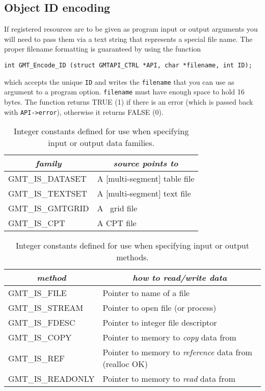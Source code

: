 \documentclass[11pt]{report}
\begin{document}
\subsection{Object ID encoding}
If registered resources are to be given as program input or output arguments you will need to pass them via
a text string that represents a special file name.  The proper filename formatting is guaranteed by using the
function

\begin{verbatim}
int GMT_Encode_ID (struct GMTAPI_CTRL *API, char *filename, int ID);
\end{verbatim}
which accepts the unique \texttt{ID} and writes the \texttt{filename} that
you can use as argument to a program option.  \texttt{filename} must have enough space to hold 16 bytes.
The function returns TRUE (1) if there is an error (which is passed back with \texttt{API->error}),
otherwise it returns FALSE (0).


\begin{table}[h]
\small
\centering
\begin{tabular}{|l|l|} \hline
\multicolumn{1}{|c|}{\emph{family}} & \multicolumn{1}{c|}{\emph{source points to}} \\ \hline
GMT\_IS\_DATASET		&       A [multi-segment] table file \\ \hline
GMT\_IS\_TEXTSET		&       A [multi-segment] text file \\ \hline
GMT\_IS\_GMTGRID		&       A \GMT\ grid file \\ \hline
GMT\_IS\_CPT			&       A CPT file \\ \hline
\end{tabular}
\caption{Integer constants defined for use when specifying input or output data families.}
\label{tbl:family}
\end{table}


\begin{table}[h]
\small
\centering
\begin{tabular}{|l|l|} \hline
\multicolumn{1}{|c|}{\emph{method}} & \multicolumn{1}{c|}{\emph{how to read/write data}} \\ \hline
GMT\_IS\_FILE		&       Pointer to name of a file \\ \hline
GMT\_IS\_STREAM		&       Pointer to open file (or process)  \\ \hline
GMT\_IS\_FDESC		&       Pointer to integer file descriptor \\ \hline
GMT\_IS\_COPY		&       Pointer to memory to \emph{copy} data from \\ \hline
GMT\_IS\_REF		&       Pointer to memory to \emph{reference} data from (realloc OK) \\ \hline
GMT\_IS\_READONLY	&       Pointer to memory to \emph{read} data from \\ \hline
\end{tabular}
\caption{Integer constants defined for use when specifying input or output methods.}
\label{tbl:methods}
\end{table}
\end{document}
